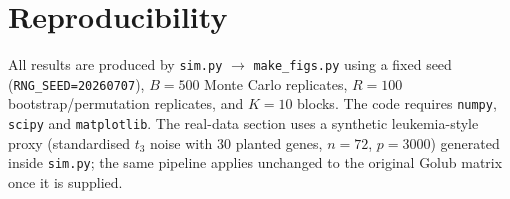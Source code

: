 \documentclass[11pt]{article}
\theoremstyle{plain}
\theoremstyle{definition}
\begin{document}
\section{Reproducibility}
\label{sec:repro}

All results are produced by
\texttt{sim.py} $\to$ \texttt{make\_figs.py} using a fixed seed
(\texttt{RNG\_SEED=20260707}), $B=500$ Monte Carlo replicates, $R=100$
bootstrap/permutation replicates, and $K=10$ blocks. The code requires
\texttt{numpy}, \texttt{scipy} and \texttt{matplotlib}. The real-data section
uses a synthetic leukemia-style proxy (standardised $t_3$ noise with 30 planted
genes, $n=72$, $p=3000$) generated inside \texttt{sim.py}; the same pipeline
applies unchanged to the original Golub matrix once it is supplied.
\end{document}
